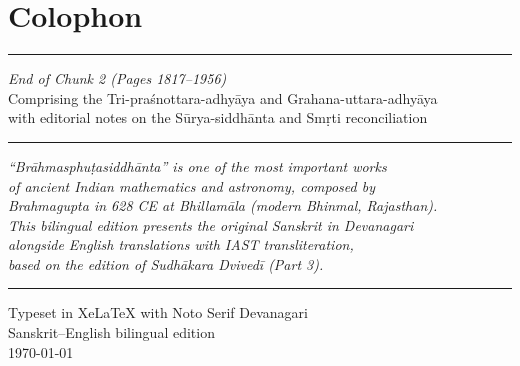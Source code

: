 \documentclass[11pt,a4paper]{article}
\newcommand{\shortline}{\noindent\rule{0.5\textwidth}{0.4pt}\par}
\begin{document}
\vspace{1cm}

\newpage
\section*{Colophon}

\begin{center}
\shortline
\vspace{0.5cm}

{\large\textit{End of Chunk 2 (Pages 1817--1956)}}\\[0.3cm]
{\small Comprising the Tri-pra\'snottara-adhyāya and Grahana-uttara-adhyāya}\\[0.3em]
{\small with editorial notes on the Sūrya-siddhānta and Smṛti reconciliation}\\[0.5cm]

\shortline

\vspace{1cm}

{\small\textit{``Brāhmasphuṭasiddhānta'' is one of the most important works}}\\
{\small\textit{of ancient Indian mathematics and astronomy, composed by}}\\
{\small\textit{Brahmagupta in 628 CE at Bhillamāla (modern Bhinmal, Rajasthan).}}\\[0.5cm]

{\small\textit{This bilingual edition presents the original Sanskrit in Devanagari}}\\
{\small\textit{alongside English translations with IAST transliteration,}}\\
{\small\textit{based on the edition of Sudhākara Dvivedī (Part 3).}}\\[1cm]

\shortline

\vspace{0.5cm}
{\small Typeset in XeLaTeX with Noto Serif Devanagari}\\
{\small Sanskrit--English bilingual edition}\\
{\small \today}
\end{center}
\end{document}
